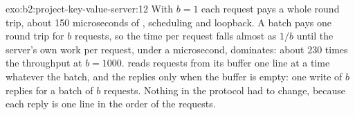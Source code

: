 \begin{solution}{exo:b2:project-key-value-server:12}
With $b = 1$ each request pays a whole round trip, about 150 microseconds of , scheduling and loopback. A
batch pays one round trip for $b$ requests, so the time per request falls almost as $1/b$ until the server's own work
per request, under a microsecond, dominates: about 230 times the throughput at $b = 1000$. 
reads requests from its buffer one line at a time whatever the batch, and  the replies only when the buffer is
empty: one write of $b$ replies for a batch of $b$ requests. Nothing in the protocol had to change, because each reply
is one line in the order of the requests.
\end{solution}
